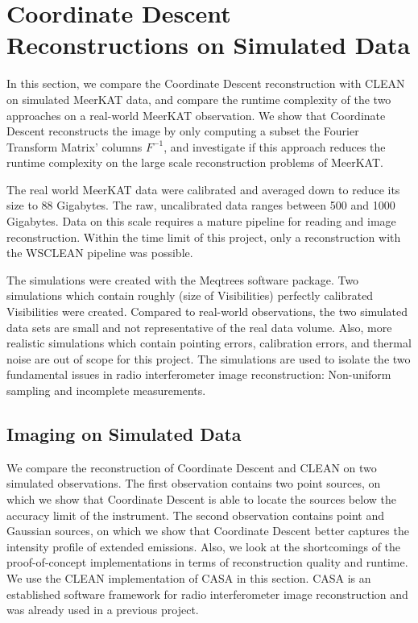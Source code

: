 \section{Coordinate Descent Reconstructions on Simulated Data}
In this section, we compare the Coordinate Descent reconstruction with CLEAN on simulated MeerKAT data, and compare the runtime complexity of the two approaches on a real-world MeerKAT observation. We show that Coordinate Descent reconstructs the image by only computing a subset  the Fourier Transform Matrix' columns $F^{-1}$, and investigate if this approach reduces the runtime complexity on the large scale reconstruction problems of MeerKAT.

The real world MeerKAT data were calibrated and averaged down to reduce its size to 88 Gigabytes. The raw, uncalibrated data ranges between 500 and 1000 Gigabytes. Data on this scale requires a mature pipeline for reading and image reconstruction. Within the time limit of this project, only a reconstruction with the WSCLEAN\cite{offringa2014wsclean} pipeline was possible.

The simulations were created with the Meqtrees software package. Two simulations which contain roughly (size of Visibilities) perfectly calibrated Visibilities were created. Compared to real-world observations, the two simulated data sets are small and not representative of the real data volume. Also, more realistic simulations which contain pointing errors, calibration errors, and thermal noise are out of scope for this project. The simulations are used to isolate the two fundamental issues in radio interferometer image reconstruction: Non-uniform sampling and incomplete measurements.

\subsection{Imaging on Simulated Data}
We compare the reconstruction of Coordinate Descent and CLEAN on two simulated observations. The first observation contains two point sources, on which we show that Coordinate Descent is able to locate the sources below the accuracy limit of the instrument. The second observation contains point and Gaussian sources, on which we show that Coordinate Descent better captures the intensity profile of extended emissions. Also, we look at the shortcomings of the proof-of-concept implementations in terms of reconstruction quality and runtime. We use the CLEAN implementation of CASA in this section. CASA is an established software framework for radio interferometer image reconstruction and was already used in a previous project.

